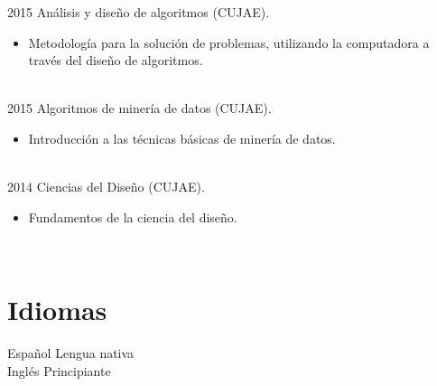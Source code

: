\documentclass[letterpaper]{twentysecondcves} %
\begin{document}
\begin{twenty}
\twentyitem
    	{2015}
		{}
        {Análisis y diseño de algoritmos (CUJAE).}
        {}
        {}
        {
        {\begin{itemize}
        \item Metodología para la solución de problemas, utilizando la computadora a través del diseño de algoritmos.
		\end{itemize}}
        }
        \\
\twentyitem
    	{2015}
		{}
        {Algoritmos de minería de datos (CUJAE).}
        {}
        {}
        {
        {\begin{itemize}
        \item Introducción a las técnicas básicas de minería de datos.
		\end{itemize}}
        }
        \\
\twentyitem
    	{2014}
		{}
        {Ciencias del Diseño (CUJAE).}
        {}
        {}
        {
        {\begin{itemize}
        \item Fundamentos de la ciencia del diseño.
		\end{itemize}}
        }


\end{twenty}

\pagebreak

\begin{twenty}
\twentyitem
    	{}
		{}
        {}
        {}
        {}
        {}
        \\
 \end{twenty} 

\section{Idiomas}

\begin{twenty} %
\twentyitem
    	{Español}
		{}
        {Lengua nativa}
        {}
        {}
        {}
        \\
	\twentyitem
    	{Inglés}
		{}
        {Principiante}
        {}
        {}
        {}


\end{twenty}
\end{document}

